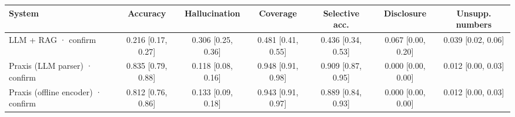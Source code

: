 \begin{tabular}{lcccccc}
\toprule
System & Accuracy & Hallucination & Coverage & Selective acc. & Disclosure & Unsupp. numbers \\
\midrule
LLM + RAG · confirm & 0.216 \scriptsize[0.17, 0.27] & 0.306 \scriptsize[0.25, 0.36] & 0.481 \scriptsize[0.41, 0.55] & 0.436 \scriptsize[0.34, 0.53] & 0.067 \scriptsize[0.00, 0.20] & 0.039 \scriptsize[0.02, 0.06] \\
Praxis (LLM parser) · confirm & 0.835 \scriptsize[0.79, 0.88] & 0.118 \scriptsize[0.08, 0.16] & 0.948 \scriptsize[0.91, 0.98] & 0.909 \scriptsize[0.87, 0.95] & 0.000 \scriptsize[0.00, 0.00] & 0.012 \scriptsize[0.00, 0.03] \\
Praxis (offline encoder) · confirm & 0.812 \scriptsize[0.76, 0.86] & 0.133 \scriptsize[0.09, 0.18] & 0.943 \scriptsize[0.91, 0.97] & 0.889 \scriptsize[0.84, 0.93] & 0.000 \scriptsize[0.00, 0.00] & 0.012 \scriptsize[0.00, 0.03] \\
\bottomrule
\end{tabular}
